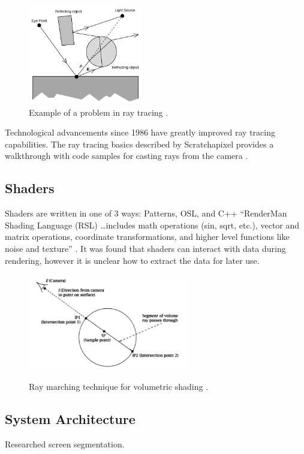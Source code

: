 \documentclass[conference]{IEEEtran}
\begin{document}
\begin{figure}[htbp]
\centerline{\includegraphics[width=5cm]{raytrace.png}}
\caption{Example of a problem in ray tracing \cite{backwards_raytrace}.}
\label{fig:raytrace}
\end{figure}

Technological advancements since 1986 have greatly improved ray tracing capabilities.
The ray tracing basics described by Scratchapixel 
provides a walkthrough with code samples for casting rays from the camera
\cite{raytrace_walkthrough}.

\subsection{Shaders}
Shaders are written in one of 3 ways: Patterns, OSL, and C++ \cite{shading}
``RenderMan Shading Language (RSL) \dots includes math operations (sin, sqrt, etc.),
vector and matrix operations, coordinate transformations, and higher level functions like noise and texture''
\cite{renderman_docs}.
It was found that shaders can interact with data during rendering,
however it is unclear how to extract the data for later use.

\begin{figure}[htbp]
\centering
{\includegraphics[width=7cm]{ray_marching.png}}
\caption{Ray marching technique for volumetric shading \cite{ray_marching}.}
\label{fig:ray_marching}
\end{figure}

\subsection{System Architecture}
Researched screen segmentation.
\end{document}
